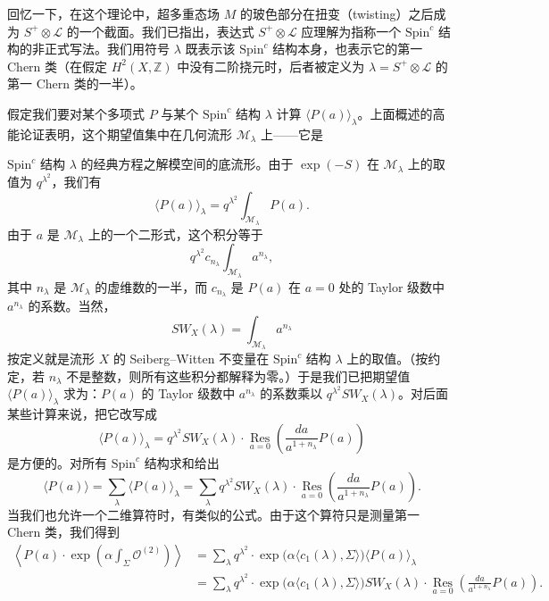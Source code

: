 回忆一下，在这个理论中，超多重态场 $M$ 的玻色部分在扭变（twisting）之后成为 $S^+\otimes\mathcal{L}$ 的一个截面。我们已指出，表达式 $S^+\otimes\mathcal{L}$ 应理解为指称一个 $\mathrm{Spin}^c$ 结构的非正式写法。我们用符号 $\lambda$ 既表示该 $\mathrm{Spin}^c$ 结构本身，也表示它的第一 Chern 类（在假定 $H^2(X,\mathbb{Z})$ 中没有二阶挠元时，后者被定义为 $\lambda=S^+\otimes\mathcal{L}$ 的第一 Chern 类的一半）。

假定我们要对某个多项式 $P$ 与某个 $\mathrm{Spin}^c$ 结构 $\lambda$ 计算 $\langle P(a)\rangle_\lambda$。上面概述的高能论证表明，这个期望值集中在几何流形 $\mathcal{M}_\lambda$ 上——它是

$\mathrm{Spin}^c$ 结构 $\lambda$ 的经典方程之解模空间的底流形。由于 $\exp(-S)$ 在 $\mathcal{M}_\lambda$ 上的取值为 $q^{\lambda^2}$，我们有
\[
\langle P(a)\rangle_\lambda=q^{\lambda^2}\int_{\mathcal{M}_\lambda}P(a).
\]
由于 $a$ 是 $\mathcal{M}_\lambda$ 上的一个二形式，这个积分等于
\[
q^{\lambda^2}c_{n_\lambda}\int_{\mathcal{M}_\lambda}a^{n_\lambda},
\]
其中 $n_\lambda$ 是 $\mathcal{M}_\lambda$ 的虚维数的一半，而 $c_{n_\lambda}$ 是 $P(a)$ 在 $a=0$ 处的 Taylor 级数中 $a^{n_\lambda}$ 的系数。当然，
\[
SW_X(\lambda)=\int_{\mathcal{M}_\lambda}a^{n_\lambda}
\]
按定义就是流形 $X$ 的 Seiberg--Witten 不变量在 $\mathrm{Spin}^c$ 结构 $\lambda$ 上的取值。（按约定，若 $n_\lambda$ 不是整数，则所有这些积分都解释为零。）于是我们已把期望值 $\langle P(a)\rangle_\lambda$ 求为：$P(a)$ 的 Taylor 级数中 $a^{n_\lambda}$ 的系数乘以 $q^{\lambda^2}SW_X(\lambda)$。对后面某些计算来说，把它改写成
\[
\langle P(a)\rangle_\lambda=q^{\lambda^2}SW_X(\lambda)\cdot\operatorname*{Res}_{a=0}\left(\frac{da}{a^{1+n_\lambda}}P(a)\right)
\]
是方便的。对所有 $\mathrm{Spin}^c$ 结构求和给出
\[
\langle P(a)\rangle=\sum_\lambda\langle P(a)\rangle_\lambda
=\sum_\lambda q^{\lambda^2}SW_X(\lambda)\cdot\operatorname*{Res}_{a=0}\left(\frac{da}{a^{1+n_\lambda}}P(a)\right).
\]
当我们也允许一个二维算符时，有类似的公式。由于这个算符只是测量第一 Chern 类，我们得到
\[
\begin{aligned}
\left\langle P(a)\cdot\exp\left(\alpha\int_\Sigma\mathcal{O}^{(2)}\right)\right\rangle
&=\sum_\lambda q^{\lambda^2}\cdot\exp\bigl(\alpha\langle c_1(\lambda),\Sigma\rangle\bigr)\langle P(a)\rangle_\lambda\\
&=\sum_\lambda q^{\lambda^2}\cdot\exp\bigl(\alpha\langle c_1(\lambda),\Sigma\rangle\bigr)SW_X(\lambda)\cdot
\operatorname*{Res}_{a=0}\left(\frac{da}{a^{1+n_\lambda}}P(a)\right).
\end{aligned}
\]

